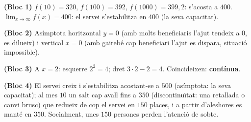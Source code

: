 \begin{solucions}
\begin{sollist}
  \item \textbf{(Bloc 1)} $f(10)=320$, $f(100)=392$, $f(1000)=399,2$: s'acosta a $400$.
        $\lim_{x\to\infty}f(x)=400$: el servei s'estabilitza en $400$ (la seva
        capacitat).
  \item \textbf{(Bloc 2)} Asímptota horitzontal $y=0$ (amb molts beneficiaris l'ajut
        tendeix a $0$, es dilueix) i vertical $x=0$ (amb gairebé cap beneficiari l'ajut
        es dispara, situació impossible).
  \item \textbf{(Bloc 3)} A $x=2$: esquerre $2^2=4$; dret $3\cdot 2-2=4$. Coincideixen:
        \textbf{contínua}.
  \item \textbf{(Bloc 4)} El servei creix i s'estabilitza acostant-se a $500$
        (asímptota: la seva capacitat); al mes $10$ un salt cap avall fins a $350$
        (discontinuïtat: una retallada o canvi brusc) que redueix de cop el servei en
        $150$ places, i a partir d'aleshores es manté en $350$. Socialment, unes $150$
        persones perden l'atenció de sobte.
\end{sollist}
\end{solucions}
